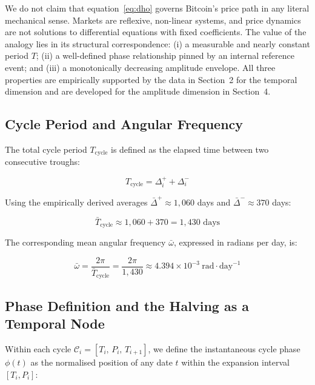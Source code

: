 We do not claim that equation~\eqref{eq:dho} governs Bitcoin's price path in
any literal mechanical sense. Markets are reflexive, non-linear systems, and
price dynamics are not solutions to differential equations with fixed
coefficients. The value of the analogy lies in its structural
correspondence: (i) a measurable and nearly constant period $T$; (ii) a
well-defined phase relationship pinned by an internal reference event; and
(iii) a monotonically decreasing amplitude envelope. All three properties are
empirically supported by the data in Section~2 for the temporal dimension and
are developed for the amplitude dimension in Section~4.

\subsection{Cycle Period and Angular Frequency}

The total cycle period $T_{\text{cycle}}$ is defined as the elapsed time
between two consecutive troughs:

\begin{equation}
  T_{\text{cycle}} = \Delta^{+}_i + \Delta^{-}_i
  \label{eq:period}
\end{equation}

Using the empirically derived averages $\bar{\Delta}^{+} \approx 1{,}060$ days
and $\bar{\Delta}^{-} \approx 370$ days:

\begin{equation}
  \bar{T}_{\text{cycle}} \approx 1{,}060 + 370 = 1{,}430 \text{ days}
  \label{eq:period_value}
\end{equation}

The corresponding mean angular frequency $\bar{\omega}$, expressed in
radians per day, is:

\begin{equation}
  \bar{\omega} = \frac{2\pi}{\bar{T}_{\text{cycle}}}
               = \frac{2\pi}{1{,}430}
               \approx 4.394 \times 10^{-3}\ \text{rad}\cdot\text{day}^{-1}
  \label{eq:omega}
\end{equation}

\subsection{Phase Definition and the Halving as a Temporal Node}

Within each cycle $\mathcal{C}_i = [T_i,\, P_i,\, T_{i+1}]$, we define the
instantaneous cycle phase $\phi(t)$ as the normalised position of any date $t$
within the expansion interval $[T_i, P_i]$:


